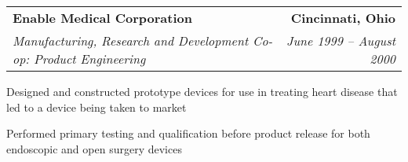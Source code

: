 \begin{tabular*}{6.6in}{@{\extracolsep{\fill}}lr}
\textbf{Enable Medical Corporation} & \textbf{Cincinnati, Ohio  }\\
\textit{Manufacturing, Research and Development Co-op: Product Engineering} & \textit{June 1999 -- August 2000}
\end{tabular*}
\begin{compactitem} 
\item Designed and constructed prototype devices for use in treating heart disease that led to a device being taken to market
\item Performed primary testing and qualification before product release for both endoscopic and open surgery devices
\medskip
\end{compactitem}